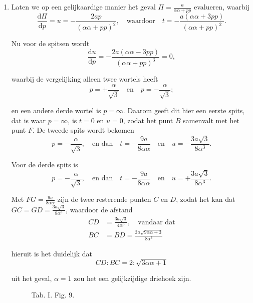 \documentclass[10pt,a4paper]{article}
\newcommand{\switchenum}{\setcounter{enumi}{\arabic{enumi}-1}\switchcolumn}
\def\D{\mathrm{d}}
\begin{document}
\begin{paracol}{2}
\begin{enumerate}[topsep=1px]
		\switchenum
		\item Laten we op een gelijkaardige manier het geval $\Pi = \frac{a}{\alpha\alpha + pp}$ evalueren, waarbij
		\[
			\frac{\D \Pi}{\D p} = u = -\frac{2a p}{(\alpha \alpha + pp)^2}, \quad \text{waardoor}\quad t = -\frac{a(\alpha \alpha+ 3pp)}{(\alpha \alpha +pp)^2}.
		\]
		\par Nu voor de spitsen wordt
		\[
			\frac{\D u}{ \D p} = -\frac{2a(\alpha\alpha- 3pp)}{(\alpha\alpha+ pp)^3} = 0,
		\]
		\par waarbij de vergelijking alleen twee wortels heeft
		\[
			p = +\frac{\alpha}{\sqrt{3}} \quad \text{en} \quad p = -\frac{\alpha}{\sqrt{3}};
		\]
		\par en een andere derde wortel is $p=\infty$. Daarom geeft dit hier een eerste spits, dat is waar $p=\infty$, is $t=0$ en $u=0$, zodat het punt $B$ samenvalt met het punt $F$. De tweede spits wordt bekomen
		\[
			p = -\frac{\alpha}{\sqrt{3}}, \quad \text{en dan} \quad t = -\frac{9a}{8\alpha \alpha} \quad \text{en} \quad u=-\frac{3a \sqrt{3}}{8\alpha^3}.
		\]
		\par Voor de derde spits is
		\[
			p = -\frac{\alpha}{\sqrt{3}}, \quad \text{en dan} \quad t = -\frac{9a}{8\alpha \alpha} \quad \text{en} \quad u=+\frac{3a \sqrt{3}}{8\alpha^3}.
		\]
		\par Met $FG = \frac{9a}{8\alpha \alpha}$ zijn de twee resterende punten $C$ en $D$, zodat het kan dat $GC=GD=\frac{3a\sqrt{3}}{8\alpha^3}$, waardoor de afstand
		\begin{align*}
			CD& = \frac{3a \sqrt{3}}{4\alpha^3}, \quad \text{vandaar dat}\\
			BC &= BD = \frac{3a \sqrt{9\alpha \alpha+3}}{8\alpha^3}
		\end{align*}
		\par hieruit is het duidelijk dat
		\[
			CD : BC = 2:\sqrt{3\alpha\alpha + 1}
		\]
		\par uit het geval, $\alpha =1$ zou het een gelijkzijdige driehoek zijn.

		\switchcolumn*
		
		\begin{figure}[h]
			\centering
			\par {
				\selectfont
				\begin{tikzpicture}[rotate=180, scale=1]
				
				\end{tikzpicture}}
			\selectfont
			\caption{Tab. I. Fig. 9.}
		\end{figure}
		\switchcolumn
		\begin{figure}[h]
			\centering
			\par {
				\selectfont
				\begin{tikzpicture}[rotate=180, scale=1]
				

\end{tikzpicture}}
\end{figure}
\end{enumerate}
\end{paracol}
\end{document}
